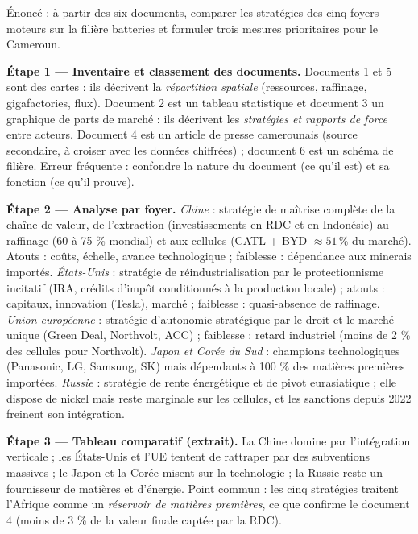 \documentclass[11pt]{article}
\newcommand{\cle}[1]{{\popxbold\color{popdark}#1}}
\newcounter{popsec}
\newcounter{popsub}
\newcommand{\courssub}[1]{%
  \stepcounter{popsub}%
  \par\vspace{9pt}\noindent{\popxbold\fontsize{11.5}{13}\selectfont\color{popink}{\color{poporange}\thepopsec.\thepopsub}\hspace{6pt}#1}\par\nopagebreak\vspace{4pt}
}
\begin{document}
\courssub{Démarche et corrigé commenté}

\begin{exoresolu}
Énoncé : à partir des six documents, comparer les stratégies des cinq foyers moteurs sur la filière batteries et formuler trois mesures prioritaires pour le Cameroun.

\tcblower

\textbf{Étape 1 — Inventaire et classement des documents.} Documents 1 et 5 sont des cartes : ils décrivent la \emph{répartition spatiale} (ressources, raffinage, gigafactories, flux). Document 2 est un tableau statistique et document 3 un graphique de parts de marché : ils décrivent les \emph{stratégies et rapports de force} entre acteurs. Document 4 est un article de presse camerounais (source secondaire, à croiser avec les données chiffrées) ; document 6 est un schéma de filière. Erreur fréquente : confondre la nature du document (ce qu'il est) et sa fonction (ce qu'il prouve).

\textbf{Étape 2 — Analyse par foyer.} \emph{Chine} : stratégie de maîtrise complète de la chaîne de valeur, de l'extraction (investissements en RDC et en Indonésie) au raffinage (60 à 75 \% mondial) et aux cellules (CATL + BYD $\approx 51\,\%$ du marché). Atouts : coûts, échelle, avance technologique ; faiblesse : dépendance aux minerais importés. \emph{États-Unis} : stratégie de \cle{réindustrialisation} par le protectionnisme incitatif (IRA, crédits d'impôt conditionnés à la production locale) ; atouts : capitaux, innovation (Tesla), marché ; faiblesse : quasi-absence de raffinage. \emph{Union européenne} : stratégie d'autonomie stratégique par le droit et le marché unique (Green Deal, Northvolt, ACC) ; faiblesse : retard industriel (moins de 2 \% des cellules pour Northvolt). \emph{Japon et Corée du Sud} : champions technologiques (Panasonic, LG, Samsung, SK) mais dépendants à 100 \% des matières premières importées. \emph{Russie} : stratégie de rente énergétique et de pivot eurasiatique ; elle dispose de nickel mais reste marginale sur les cellules, et les sanctions depuis 2022 freinent son intégration.

\textbf{Étape 3 — Tableau comparatif (extrait).} La Chine domine par l'intégration verticale ; les États-Unis et l'UE tentent de rattraper par des subventions massives ; le Japon et la Corée misent sur la technologie ; la Russie reste un fournisseur de matières et d'énergie. Point commun : les cinq stratégies traitent l'Afrique comme un \emph{réservoir de matières premières}, ce que confirme le document 4 (moins de 3 \% de la valeur finale captée par la RDC).


\end{exoresolu}
\end{document}
